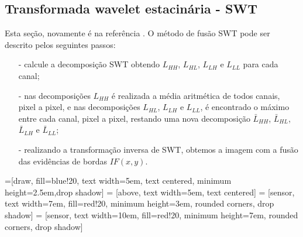 \documentclass[conference]{IEEEtran}
\begin{document}
\subsection{Transformada wavelet estacinária - SWT} Esta seção, novamente é na referência \cite{n_r}. O método de fusão SWT pode ser descrito pelos seguintes passos:
\begin{itemize}
\item[-] calcule a decomposição SWT obtendo $L_{HH}$, $L_{HL}$, $L_{LH}$ e $L_{LL}$ para cada canal;
\item[-] nas decomposições $L_{HH}$ é realizada a média aritmética de todos canais, pixel a pixel, e nas decomposições $L_{HL}$, $L_{LH}$ e $L_{LL}$, é encontrado o máximo entre cada canal, pixel a pixel, restando uma nova decomposição $\bar{L}_{HH}$, $\bar{L}_{HL}$, $\bar{L}_{LH}$ e $\bar{L}_{LL}$;
\item[-] realizando a transformação inversa de SWT, obtemos a imagem com a fusão das evidências de bordas $IF(x,y)$.  
\end{itemize}
=[draw, fill=blue!20, text width=5em, 
    text centered, minimum height=2.5em,drop shadow]
 = [above, text width=5em, text centered]
 = [sensor, text width=7em, fill=red!20, 
    minimum height=3em, rounded corners, drop shadow]
 = [sensor, text width=10em, fill=red!20, 
    minimum height=7em, rounded corners, drop shadow]
\def\blockdist{2.3}
\def\edgedist{2.5}
\end{document}

